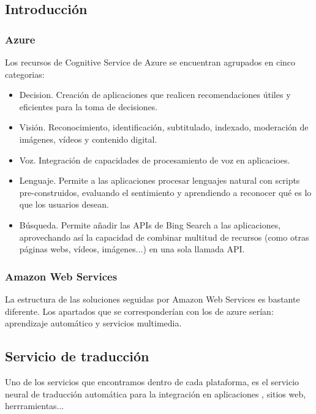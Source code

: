 \documentclass[english,runningheads,a4paper]{llncs}[2018/03/10]
\begin{document}
    \subsection{Introducción}
    \subsubsection{Azure}
    Los recursos de Cognitive Service de Azure se encuentran agrupados en cinco 
    categorias:
    
    \begin{itemize}
        \item Decision. Creación de aplicaciones que realicen recomendaciones 
        útiles y eficientes para la toma de decisiones.
        \item Visión. Reconocimiento, identificación, subtitulado, indexado, 
        moderación de imágenes, vídeos y contenido digital.
        \item Voz. Integración de capacidades de procesamiento de voz en 
        aplicacioes.
        \item Lenguaje. Permite a las aplicaciones procesar lenguajes natural 
        con scripts pre-construidos, evaluando el sentimiento y aprendiendo a 
        reconocer qué es lo que los usuarios desean.
        \item Búsqueda. Permite añadir las APIs de Bing Search a las 
        aplicaciones, aprovechando así la capacidad de combinar multitud de 
        recursos (como otras páginas webs, vídeos, imágenes...) en una sola 
        llamada API.
    \end{itemize}
    \subsubsection{Amazon Web Services}
    La estructura de las soluciones seguidas por Amazon Web Services es bastante
    diferente. Los apartados que se corresponderían con los de azure serían: 
    aprendizaje automático y servicios multimedia.
    
    
    \subsection{Servicio de traducción}
    Uno de los servicios que encontramos dentro de cada plataforma, es el 
    servicio neural de traducción automática para la integración en aplicaciones
    , sitios web, herrramientas...
\end{document}
